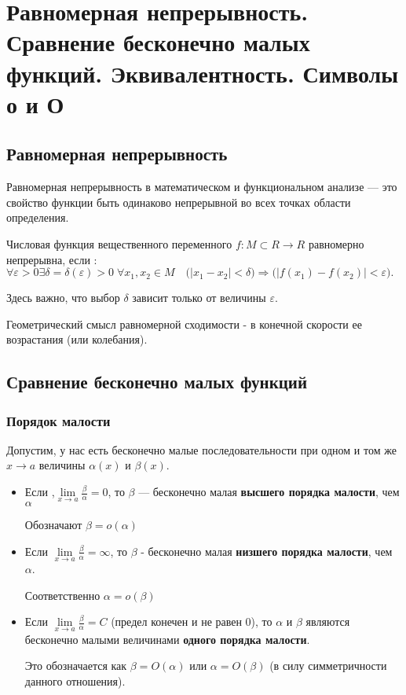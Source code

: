 \section{Равномерная непрерывность. Сравнение бесконечно малых функций. Эквивалентность. Символы о и О}

\subsection{Равномерная непрерывность}

Равномерная непрерывность в математическом и функциональном анализе — это свойство функции быть одинаково непрерывной во всех точках области определения.

Числовая функция вещественного переменного $f:M \subset R \to R $ равномерно непрерывна, если
: $ \forall \varepsilon > 0  \exists \delta = \delta(\varepsilon)>0 \; \forall x_1,x_2 \in M\quad \bigl(|x_1-x_2| < \delta \bigr) \Rightarrow \bigl( |f(x_1)-f(x_2)| < \varepsilon\bigr).$

Здесь важно, что выбор $\delta$ зависит только от величины $\varepsilon$.

Геометрический смысл равномерной сходимости - в конечной скорости ее возрастания (или колебания).


\subsection{Сравнение бесконечно малых функций}


\subsubsection{Порядок малости}

Допустим, у нас есть бесконечно малые последовательности при одном и том же $x\to a$ величины $\alpha(x)$ и $\beta(x)$.

\begin{itemize}

\item 
Если ,$\lim\limits_{x \to a}\frac{\beta}{\alpha} = 0$, то $\beta$ — 
бесконечно малая \textbf{высшего порядка малости}, чем $\alpha$

Обозначают $\beta=o(\alpha)$

\item 
Если $\lim\limits_{x\to a}\frac{\beta}{\alpha} = \infty$, то $\beta$ -
бесконечно малая \textbf{низшего порядка малости}, чем $\alpha$.

Соответственно $\alpha=o(\beta)$

\item 
Если $\lim\limits_{x\to a}\frac{\beta}{\alpha} = C$ (предел конечен и не равен 0), то $\alpha$ и $\beta$ являются бесконечно малыми величинами \textbf{одного порядка малости}.

Это обозначается как $\beta=O(\alpha)$ или $\alpha=O(\beta)$ (в силу симметричности данного отношения).

\end{itemize}



